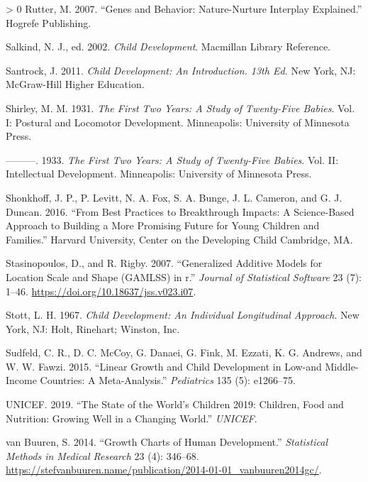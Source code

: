 \documentclass[
]{book}
\newlength{\cslhangindent}
\newenvironment{CSLReferences}[3] %
 {%
  \setlength{\parindent}{0pt}
  \ifodd #1 \everypar{\setlength{\hangindent}{\cslhangindent}}\ignorespaces\fi
  \ifnum #2 > 0
  \setlength{\parskip}{#2\baselineskip}
  \fi
 }%
 {}
\begin{document}
\begin{CSLReferences}{1}{0}
\leavevmode\hypertarget{ref-rutter2007genes}{}%
Rutter, M. 2007. {``Genes and Behavior: Nature-Nurture Interplay Explained.''} Hogrefe Publishing.

\leavevmode\hypertarget{ref-salkind2002}{}%
Salkind, N. J., ed. 2002. \emph{Child Development}. Macmillan Library Reference.

\leavevmode\hypertarget{ref-santrock2010}{}%
Santrock, J. 2011. \emph{Child Development: An Introduction. 13th Ed.} New York, NJ: McGraw-Hill Higher Education.

\leavevmode\hypertarget{ref-shirley1931}{}%
Shirley, M. M. 1931. \emph{The First Two Years: A Study of Twenty-Five Babies}. Vol. I: Postural and Locomotor Development. Minneapolis: University of Minnesota Press.

\leavevmode\hypertarget{ref-shirley1933}{}%
---------. 1933. \emph{The First Two Years: A Study of Twenty-Five Babies}. Vol. II: Intellectual Development. Minneapolis: University of Minnesota Press.

\leavevmode\hypertarget{ref-skonkhoff2016best}{}%
Shonkhoff, J. P., P. Levitt, N. A. Fox, S. A. Bunge, J. L. Cameron, and G. J. Duncan. 2016. {``From Best Practices to Breakthrough Impacts: A Science-Based Approach to Building a More Promising Future for Young Children and Families.''} Harvard University, Center on the Developing Child Cambridge, MA.

\leavevmode\hypertarget{ref-stasinopoulos2007}{}%
Stasinopoulos, D., and R. Rigby. 2007. {``Generalized Additive Models for Location Scale and Shape ({GAMLSS}) in r.''} \emph{Journal of Statistical Software} 23 (7): 1--46. \url{https://doi.org/10.18637/jss.v023.i07}.

\leavevmode\hypertarget{ref-stott1967}{}%
Stott, L. H. 1967. \emph{Child Development: {A}n Individual Longitudinal Approach}. New York, NJ: Holt, Rinehart; Winston, Inc.

\leavevmode\hypertarget{ref-sudfeld2015linear}{}%
Sudfeld, C. R., D. C. McCoy, G. Danaei, G. Fink, M. Ezzati, K. G. Andrews, and W. W. Fawzi. 2015. {``Linear Growth and Child Development in Low-and Middle-Income Countries: A Meta-Analysis.''} \emph{Pediatrics} 135 (5): e1266--75.

\leavevmode\hypertarget{ref-unicef2019}{}%
UNICEF. 2019. {``The State of the World's Children 2019: Children, Food and Nutrition: Growing Well in a Changing World.''} \emph{UNICEF}.

\leavevmode\hypertarget{ref-vanbuuren2014}{}%
van Buuren, S. 2014. {``Growth Charts of Human Development.''} \emph{Statistical Methods in Medical Research} 23 (4): 346--68. \url{https://stefvanbuuren.name/publication/2014-01-01_vanbuuren2014gc/}.


\end{CSLReferences}
\end{document}
